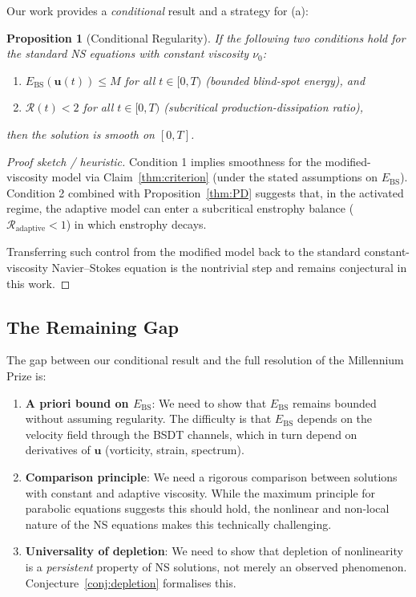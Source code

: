 \documentclass[12pt, a4paper]{article}
\newtheorem{proposition}[theorem]{Proposition}
\newcommand{\Ebs}{E_{\mathrm{BS}}}
\begin{document}
Our work provides a \emph{conditional} result and a strategy for (a):

\begin{proposition}[Conditional Regularity]\label{prop:conditional}
If the following two conditions hold for the standard NS equations
with constant viscosity $\nu_0$:
\begin{enumerate}
\item $\Ebs(\mathbf{u}(t)) \leq M$ for all $t \in [0,T)$ (bounded
  blind-spot energy), and
\item $\mathcal{R}(t) < 2$ for all $t \in [0,T)$
  (subcritical production-dissipation ratio),
\end{enumerate}
then the solution is smooth on $[0,T]$.
\end{proposition}

\begin{proof}[Proof sketch / heuristic]
Condition 1 implies smoothness for the modified-viscosity model via
Claim~\ref{thm:criterion} (under the stated assumptions on $\Ebs$).
Condition 2 combined with Proposition~\ref{thm:PD} suggests that, in the
activated regime, the adaptive model can enter a subcritical enstrophy
balance ($\mathcal{R}_{\mathrm{adaptive}} < 1$) in which enstrophy decays.

Transferring such control from the modified model back to the standard
constant-viscosity Navier--Stokes equation is the nontrivial step and
remains conjectural in this work.
\end{proof}

\subsection{The Remaining Gap}

The gap between our conditional result and the full resolution
of the Millennium Prize is:

\begin{enumerate}
\item \textbf{A priori bound on $\Ebs$}: We need to show that
  $\Ebs$ remains bounded without assuming regularity.
  The difficulty is that $\Ebs$ depends on the velocity field
  through the BSDT channels, which in turn depend on derivatives
  of $\mathbf{u}$ (vorticity, strain, spectrum).

\item \textbf{Comparison principle}: We need a rigorous comparison
  between solutions with constant and adaptive viscosity.
  While the maximum principle for parabolic equations suggests
  this should hold, the nonlinear and non-local nature of the
  NS equations makes this technically challenging.

\item \textbf{Universality of depletion}: We need to show that
  depletion of nonlinearity is a \emph{persistent} property of
  NS solutions, not merely an observed phenomenon.
  Conjecture~\ref{conj:depletion} formalises this.
\end{enumerate}
\end{document}
